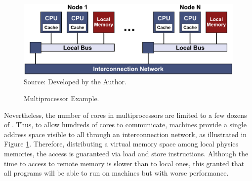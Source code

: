 			\begin{figure}[h]
				\centering
				\caption{\numa Multiprocessor Example.}

				\includegraphics[width=.8\textwidth]{images/numa.pdf} \\ \vspace{0.3cm}
				Source: Developed by the Author.

				\label{fig.numa}
			\end{figure}

			Nevertheless, the number of cores in \uma multiprocessors are limited
			to a few dozens of \cpus.
			Thus, to allow hundreds of cores to communicate, \numa machines provide
			a single address space visible to all \cpus through an interconnection
			network,  as illustrated in Figure \ref{fig.numa}.
			Therefore, distributing a virtual memory space among local physics memories,
			the access is guaranteed via load and store instructions.
			Although the time to access to remote memory is slower than to local ones,
			this granted that all \uma programs will be able to run on \numa machines
			but with worse performance.

